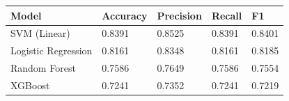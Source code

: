 \begin{tabular}{lllll}
\toprule
Model & Accuracy & Precision & Recall & F1 \\
\midrule
SVM (Linear) & 0.8391 & 0.8525 & 0.8391 & 0.8401 \\
Logistic Regression & 0.8161 & 0.8348 & 0.8161 & 0.8185 \\
Random Forest & 0.7586 & 0.7649 & 0.7586 & 0.7554 \\
XGBoost & 0.7241 & 0.7352 & 0.7241 & 0.7219 \\
\bottomrule
\end{tabular}
